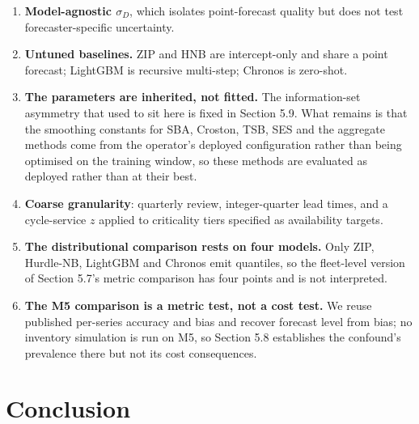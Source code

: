\documentclass[11pt]{article}
\begin{document}
\begin{enumerate}
\item \textbf{Model-agnostic $\sigma_{D}$}, which isolates point-forecast
  quality but does not test forecaster-specific uncertainty.
\item \textbf{Untuned baselines.} ZIP and HNB are intercept-only and share a
  point forecast; LightGBM is recursive multi-step; Chronos is zero-shot.
\item \textbf{The parameters are inherited, not fitted.} The information-set
  asymmetry that used to sit here is fixed in Section 5.9. What remains is that
  the smoothing constants for SBA, Croston, TSB, SES and the aggregate methods
  come from the operator's deployed configuration rather than being optimised
  on the training window, so these methods are evaluated as deployed rather
  than at their best.
\item \textbf{Coarse granularity}: quarterly review, integer-quarter lead
  times, and a cycle-service $z$ applied to criticality tiers specified as
  availability targets.
\item \textbf{The distributional comparison rests on four models.} Only ZIP,
  Hurdle-NB, LightGBM and Chronos emit quantiles, so the fleet-level version of
  Section 5.7's metric comparison has four points and is not interpreted.
\item \textbf{The M5 comparison is a metric test, not a cost test.} We reuse
  published per-series accuracy and bias and recover forecast level from bias;
  no inventory simulation is run on M5, so Section 5.8 establishes the
  confound's prevalence there but not its cost consequences.
\end{enumerate}

\section{Conclusion}
\end{document}
